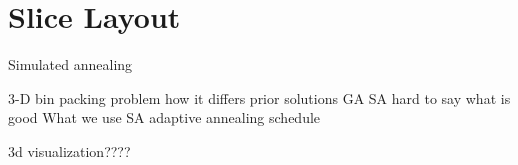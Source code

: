 \section{Slice Layout}
Simulated annealing

3-D bin packing problem 
	how it differs
prior solutions
	GA
	SA
	hard to say what is good
What we use
	SA
	adaptive annealing schedule 
	
3d visualization????